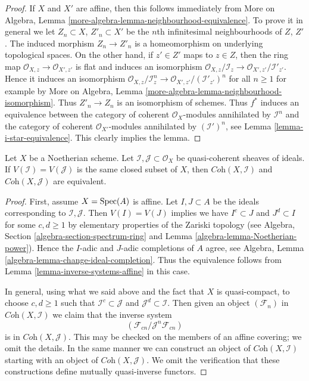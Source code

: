 \begin{proof}
If $X$ and $X'$ are affine, then this follows immediately from
More on Algebra, Lemma \ref{more-algebra-lemma-neighbourhood-equivalence}.
To prove it in general we let $Z_n \subset X$, $Z'_n \subset X'$
be the $n$th infinitesimal neighbourhoods of $Z$, $Z'$.
The induced morphism $Z_n \to Z'_n$ is a homeomorphism on
underlying topological spaces. On the other hand, if $z' \in Z'$
maps to $z \in Z$, then the ring map
$\mathcal{O}_{X, z} \to \mathcal{O}_{X', z'}$ is flat
and induces an isomorphism
$\mathcal{O}_{X, z}/\mathcal{I}_z \to \mathcal{O}_{X', z'}/\mathcal{I}'_{z'}$.
Hence it induces an isomorphism
$\mathcal{O}_{X, z}/\mathcal{I}_z^n \to
\mathcal{O}_{X', z'}/(\mathcal{I}'_{z'})^n$
for all $n \geq 1$ for example by
More on Algebra, Lemma \ref{more-algebra-lemma-neighbourhood-isomorphism}.
Thus $Z'_n \to Z_n$ is an isomorphism of schemes.
Thus $f^*$ induces an equivalence between the
category of coherent $\mathcal{O}_X$-modules annihilated by $\mathcal{I}^n$
and the
category of coherent $\mathcal{O}_{X'}$-modules annihilated by
$(\mathcal{I}')^n$, see
Lemma \ref{lemma-i-star-equivalence}.
This clearly implies the lemma.
\end{proof}

\begin{lemma}
\label{lemma-inverse-systems-ideals-equivalence}
Let $X$ be a Noetherian scheme. Let
$\mathcal{I}, \mathcal{J} \subset \mathcal{O}_X$
be quasi-coherent sheaves of ideals.
If $V(\mathcal{I}) = V(\mathcal{J})$ is the same closed subset
of $X$, then $\textit{Coh}(X, \mathcal{I})$ and $\textit{Coh}(X, \mathcal{J})$
are equivalent.
\end{lemma}

\begin{proof}
First, assume $X = \mathop{\mathrm{Spec}}(A)$ is affine. Let $I, J \subset A$ be the ideals
corresponding to $\mathcal{I}, \mathcal{J}$. Then $V(I) = V(J)$
implies we have $I^c \subset J$ and $J^d \subset I$ for some $c, d \geq 1$
by elementary properties of the Zariski topology
(see Algebra, Section \ref{algebra-section-spectrum-ring} and
Lemma \ref{algebra-lemma-Noetherian-power}).
Hence the $I$-adic and $J$-adic completions of $A$ agree, see
Algebra, Lemma \ref{algebra-lemma-change-ideal-completion}.
Thus the equivalence follows from Lemma \ref{lemma-inverse-systems-affine}
in this case.

\medskip\noindent
In general, using what we said above and the fact that
$X$ is quasi-compact, to choose $c, d \geq 1$ such that
$\mathcal{I}^c \subset \mathcal{J}$ and $\mathcal{J}^d \subset \mathcal{I}$.
Then given an object $(\mathcal{F}_n)$ in
$\textit{Coh}(X, \mathcal{I})$ we claim that the
inverse system
$$
(\mathcal{F}_{cn}/\mathcal{J}^n\mathcal{F}_{cn})
$$
is in $\textit{Coh}(X, \mathcal{J})$. This may be checked on
the members of an affine covering; we omit the details.
In the same manner we can construct an object of
$\textit{Coh}(X, \mathcal{I})$ starting with an object of
$\textit{Coh}(X, \mathcal{J})$. We omit the verification
that these constructions define mutually quasi-inverse functors.
\end{proof}






